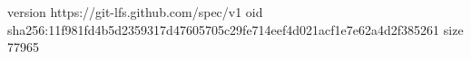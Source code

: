 version https://git-lfs.github.com/spec/v1
oid sha256:11f981fd4b5d2359317d47605705c29fe714eef4d021acf1e7e62a4d2f385261
size 77965
